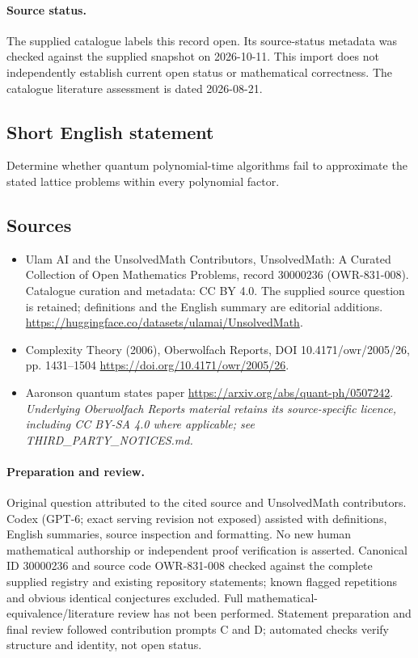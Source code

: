 \documentclass[11pt]{article}
\begin{document}
\paragraph{Source status.}
The supplied catalogue labels this record open. Its source-status metadata was checked against the supplied snapshot on 2026-10-11. This import does not independently establish current open status or mathematical correctness. The catalogue literature assessment is dated 2026-08-21.
\subsection{Short English statement}
Determine whether quantum polynomial-time algorithms fail to approximate the stated lattice problems within every polynomial factor.
\subsection{Sources}
\begin{itemize}
\item[\hypertarget{source:30000236:1}{S1}] Ulam AI and the UnsolvedMath Contributors, UnsolvedMath: A Curated Collection of Open Mathematics Problems, record 30000236 (OWR-831-008). Catalogue curation and metadata: CC BY 4.0. The supplied source question is retained; definitions and the English summary are editorial additions.
\url{https://huggingface.co/datasets/ulamai/UnsolvedMath}.
\item[\hypertarget{source:30000236:2}{S2}] Complexity Theory (2006), Oberwolfach Reports, DOI 10.4171/owr/2005/26, pp. 1431--1504
\url{https://doi.org/10.4171/owr/2005/26}.
\item[\hypertarget{source:30000236:3}{S3}] Aaronson quantum states paper
\url{https://arxiv.org/abs/quant-ph/0507242}.
\textit{Underlying Oberwolfach Reports material retains its source-specific licence, including CC BY-SA 4.0 where applicable; see THIRD\_PARTY\_NOTICES.md.}
\end{itemize}
\paragraph{Preparation and review.}
Original question attributed to the cited source and UnsolvedMath contributors. Codex (GPT-6; exact serving revision not exposed) assisted with definitions, English summaries, source inspection and formatting. No new human mathematical authorship or independent proof verification is asserted. Canonical ID 30000236 and source code OWR-831-008 checked against the complete supplied registry and existing repository statements; known flagged repetitions and obvious identical conjectures excluded. Full mathematical-equivalence/literature review has not been performed. Statement preparation and final review followed contribution prompts C and D; automated checks verify structure and identity, not open status.
\label{end:30000236}
\end{document}
